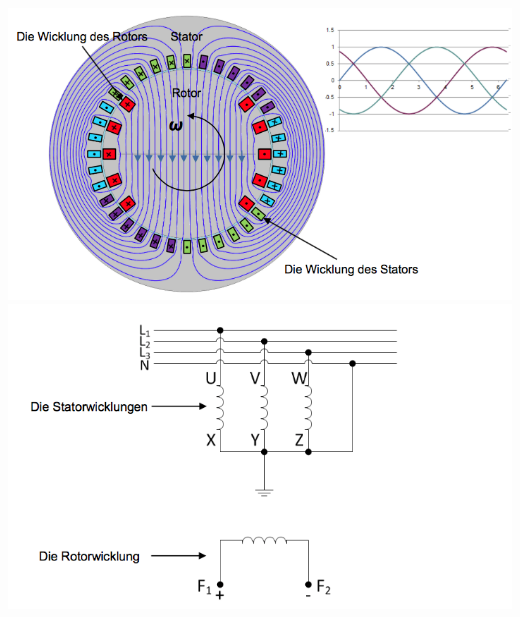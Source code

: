\begin{minipage}{0.5 \linewidth}
\includegraphics[width = \linewidth]{./Pics/VL1011/Aufbau2}
\includegraphics[width = \linewidth]{./Pics/VL1011/Aufbau4}
\end{minipage}

